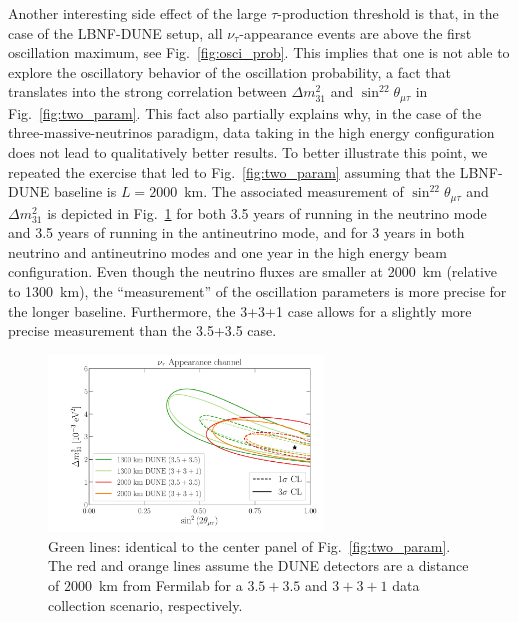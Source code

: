 \documentclass[aps,prd,onecolumn,nofootinbib,superscriptaddress, 11pt]{revtex4}
\begin{document}
Another interesting side effect of the large $\tau$-production threshold is that, in the case of the LBNF-DUNE setup, all $\nu_{\tau}$-appearance events are above the first oscillation maximum, see Fig.~\ref{fig:osci_prob}. This implies that one is not able to explore the oscillatory behavior of the oscillation probability, a fact that translates into the strong correlation between $\Delta m^2_{31}$ and $\sin^22\theta_{\mu\tau}$  in Fig.~\ref{fig:two_param}. This fact also partially explains why, in the case of the three-massive-neutrinos paradigm, data taking in the high energy configuration does not lead to qualitatively better results. To better illustrate this point, we repeated the exercise that led to  Fig.~\ref{fig:two_param} assuming that the LBNF-DUNE baseline is $L=2000$~km. The associated measurement of $\sin^22\theta_{\mu\tau}$ and $\Delta m^2_{31}$ is depicted in Fig.~\ref{fig:2000km} for both 3.5 years of running in the neutrino mode and 3.5 years of running in the antineutrino mode, and for 3 years in both neutrino and antineutrino modes and one year in the high energy beam configuration. Even though the neutrino fluxes are smaller at 2000~km (relative to 1300~km), the ``measurement'' of the oscillation parameters is more precise for the longer baseline. Furthermore, the 3+3+1 case allows for a slightly more precise measurement than the 3.5+3.5 case. 
\begin{figure}[ht]
\center
\includegraphics[width=0.65\textwidth]{DUNE_2000km.pdf}
\caption{Green lines: identical to the center panel of Fig.~\ref{fig:two_param}. The red and orange lines assume the DUNE detectors are a distance of $2000$~km from Fermilab for a $3.5 + 3.5$ and $3 + 3 + 1$ data collection scenario, respectively.}
\label{fig:2000km}
\end{figure}
\end{document}
